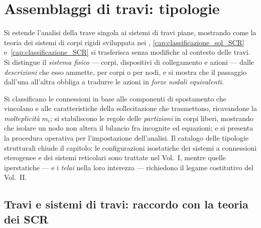 \graphicspath{{Parti/P04-Travi_rigide/C03-Assemblaggi_travi/Figure/}}
\chapter{Assemblaggi di travi: tipologie}
\label{cap:assemblaggi_travi}

\begin{sommario}
	Si estende l'analisi della trave singola ai sistemi
	di travi piane, mostrando come la teoria dei sistemi
	di corpi rigidi sviluppata nei
	,
	\ref{cap:classificazione_sol_SCR}
	e~\ref{cap:classificazione_SCR}
	si trasferisca senza modifiche al contesto delle travi.
	Si distingue il \emph{sistema fisico} --- corpi,
	dispositivi di collegamento e azioni --- dalle
	\emph{descrizioni} che esso ammette, per corpi o per
	nodi, e si mostra che il passaggio dall'una all'altra
	obbliga a tradurre le azioni in \emph{forze nodali
		equivalenti}.
	
	Si classificano le connessioni in base alle componenti
	di spostamento che vincolano e alle caratteristiche
	della sollecitazione che trasmettono, ricavandone la
	\emph{molteplicità} $m_i$; si stabiliscono le regole
	delle \emph{partizioni} in corpi liberi, mostrando che
	isolare un nodo non altera il bilancio fra incognite ed
	equazioni; e si presenta la procedura operativa per
	l'impostazione dell'analisi. Il catalogo delle tipologie
	strutturali chiude il capitolo: le configurazioni
	isostatiche dei sistemi a connessioni eterogenee e dei
	sistemi reticolari sono trattate nel Vol.~I, mentre
	quelle iperstatiche --- e i \emph{telai} nella loro
	interezza --- richiedono il legame costitutivo del
	Vol.~II.
\end{sommario}



\section{Travi e sistemi di travi: raccordo con la teoria
	dei SCR}
\label{sec:raccordo_SCR}

